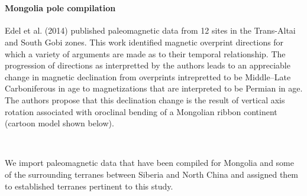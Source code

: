 \documentclass[11pt]{article}
\begin{document}
    \begin{center}
    \end{center}
    { \hspace*{\fill} \\}
    
    \paragraph{Mongolia pole compilation}\label{mongolia-pole-compilation}

    Edel et al. (2014) published paleomagnetic data from 12 sites in the
Trans-Altai and South Gobi zones. This work identified magnetic
overprint directions for which a variety of arguments are made as to
their temporal relationship. The progression of directions as
interpretted by the authors leads to an appreciable change in magnetic
declination from overprints intrepretted to be Middle--Late
Carboniferous in age to magnetizations that are interpreted to be
Permian in age. The authors propose that this declination change is the
result of vertical axis rotation associated with oroclinal bending of a
Mongolian ribbon continent (cartoon model shown below).


    \begin{center}
    \end{center}
    { \hspace*{\fill} \\}
    
    We import paleomagnetic data that have been compiled for Mongolia and
some of the surrounding terranes between Siberia and North China and
assigned them to established terranes pertinent to this study.
\end{document}
